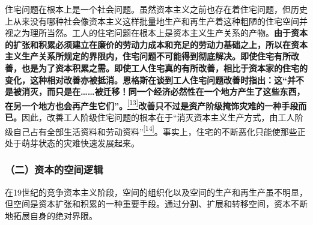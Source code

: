 \documentclass[UTF8, fontset = sourcesans, a4paper, oneside, zihao =
-4, scheme=chinese, no-math, space=true]{ctexbook}
\begin{document}
住宅问题在根本上是一个社会问题。虽然资本主义之前也存在着住宅问题，但历史上从来没有哪种社会像资本主义这样批量地生产和再生产着这种粗陋的住宅空间并视之为理所当然。工人的住宅问题在根本上是资本主义生产关系的产物。\textbf{由于资本的扩张和积累必须建立在廉价的劳动力成本和充足的劳动力基础之上，所以在资本主义生产关系所规定的界限内，住宅问题不可能得到彻底解决。即使住宅有所改善，也是为了资本积累之需。即使工人住宅真的有所改善，相比于资本家的住宅的变化，这种相对改善亦被抵消。恩格斯在谈到工人住宅问题改善时指出：这``并不是被消灭，而只是在……被迁移！同一个经济必然性在一个地方产生了这些东西，在另一个地方也会再产生它们''。}\protect\hypertarget{part0010_split_002.htmlux5cux23w13}{}{}\protect\hyperlink{part0010_split_002.htmlux5cux23m13}{\textsuperscript{{[}13{]}}}\textbf{改善只不过是资产阶级掩饰灾难的一种手段而已。}因此，改善工人阶级住宅问题的根本在于``消灭资本主义生产方式，由工人阶级自己占有全部生活资料和劳动资料''\protect\hypertarget{part0010_split_002.htmlux5cux23w14}{}{}\protect\hyperlink{part0010_split_002.htmlux5cux23m14}{\textsuperscript{{[}14{]}}}。事实上，住宅的不断恶化只能使那些正处于萌芽状态的灾难快速发展起来。

\subsubsection{（二）资本的空间逻辑}\label{part0010_split_002.htmlux5cux23d036}

在19世纪的竞争资本主义阶段，空间的组织化以及空间的生产和再生产虽不明显，但空间是资本扩张和积累的一种重要手段。通过分割、扩展和转移空间，资本不断地拓展自身的绝对界限。
\end{document}
